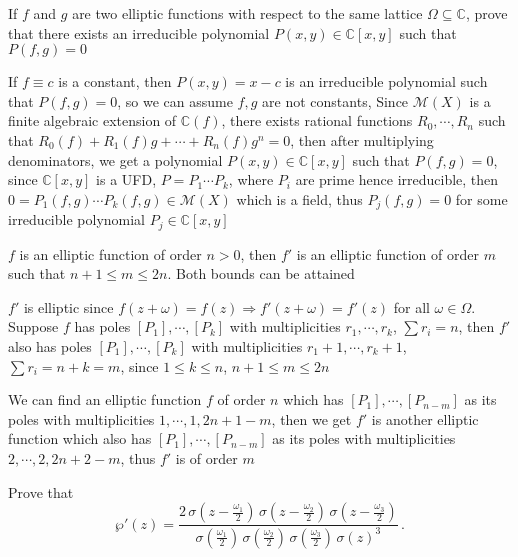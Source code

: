 \documentclass[main]{subfiles}
\begin{document}
\begin{exercise}
If $f$ and $g$ are two elliptic functions with respect to the same lattice $\Omega\subseteq\mathbb C$, prove that there exists an irreducible polynomial $P(x,y)\in \mathbb C[x,y]$ such that $P(f,g)=0$
\end{exercise}

\begin{solution}
If $f\equiv c$ is a constant, then $P(x,y)=x-c$ is an irreducible polynomial such that $P(f,g)=0$, so we can assume $f,g$ are not constants, Since $\mathcal{M}(X)$ is a finite algebraic extension of $\mathbb{C}(f)$, there exists rational functions $R_0,\cdots,R_n$ such that $R_0(f)+R_1(f)g+\cdots+R_n(f)g^n=0$, then after multiplying denominators, we get a polynomial $P(x,y)\in \mathbb{C}[x,y]$ such that $P(f,g)=0$, since $\mathbb{C}[x,y]$ is a UFD, $P=P_1\cdots P_k$, where $P_i$ are prime hence irreducible, then $0=P_1(f,g)\cdots P_k(f,g)\in \mathcal{M}(X)$ which is a field, thus $P_j(f,g)=0$ for some irreducible polynomial $P_j\in \mathbb{C}[x,y]$ 
\end{solution}

\begin{exercise}
$f$ is an elliptic function of order $n>0$, then $f'$ is an elliptic function of order $m$ such that $n+1\leq m \leq 2n$. Both bounds can be attained
\end{exercise}

\begin{solution}
$f'$ is elliptic since $f(z+\omega)=f(z)\Rightarrow f'(z+\omega)=f'(z)$ for all $\omega\in\Omega$. Suppose $f$ has poles $[P_1],\cdots,[P_{k}]$ with multiplicities $r_1,\cdots,r_k$, $\sum r_i=n$, then $f'$ also has poles $[P_1],\cdots,[P_{k}]$ with multiplicities $r_1+1,\cdots,r_k+1$, $\sum r_i=n+k=m$, since $1\leq k\leq n$, $n+1\leq m\leq 2n$ \par
We can find an elliptic function $f$ of order $n$ which has $[P_1],\cdots,[P_{n-m}]$ as its poles with multiplicities $1,\cdots,1,2n+1-m$, then we get $f'$ is another elliptic function which also has $[P_1],\cdots,[P_{n-m}]$ as its poles with multiplicities $2,\cdots,2,2n+2-m$, thus $f'$ is of order $m$
\end{solution}

\begin{exercise}
Prove that 
\[
\wp'(z) = \frac{2\,\sigma(z-\frac{\omega_1}{2})\,
\sigma(z-\frac{\omega_2}{2})\,\sigma(z-\frac{\omega_3}{2})}
{\sigma(\frac{\omega_1}{2})\,\sigma(\frac{\omega_2}{2})\,
\sigma(\frac{\omega_3}{2})\,\sigma(z)^3}\,.
\]
\end{exercise}
\end{document}
